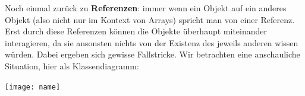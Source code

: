 \documentclass[fontsize=12pt]{article}
\begin{document}
Noch einmal zurück zu \textbf{Referenzen}: immer wenn ein Objekt auf ein anderes Objekt  (also nicht nur im Kontext von Arrays) spricht man von einer Referenz. Erst durch diese Referenzen können die Objekte überhaupt miteinander interagieren, da sie ansonsten nichts von der Existenz des jeweils anderen wissen würden. Dabei ergeben sich gewisse Fallstricke. Wir betrachten eine anschauliche Situation, hier als Klassendiagramm:
\begin{center}
    \texttt{[image: name]}
\end{center} 
\end{document}
